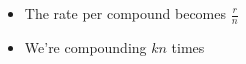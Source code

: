 \documentclass[preview]{standalone}
\begin{document}
\begin{center}
\begin{itemize} \item The rate per compound becomes $\frac rn$ \\ \item We're compounding $kn$ times \end{itemize}
\end{center}
\end{document}
